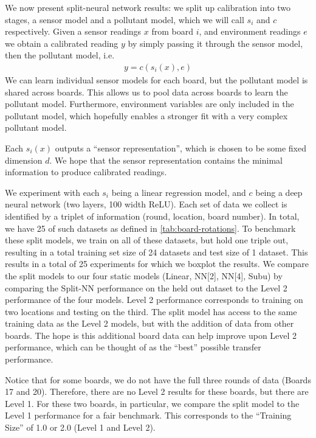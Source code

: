 \documentclass[journal abbreviation, manuscript]{copernicus}
\begin{document}
We now present split-neural network results: we split
up calibration into two stages, a sensor model
and a pollutant model, which we will call $s_i$ and $c$
respectively.
Given a sensor readings $x$ from board $i$,
and environment readings $e$
we obtain a calibrated reading $y$ by simply passing it through
the sensor model, then the pollutant model, i.e.
\begin{align*}
    y = c(s_i(x), e)
\end{align*}
We can learn individual sensor models for each board,
but the pollutant model is shared across boards. This allows
us to pool data across boards to learn the pollutant model.
Furthermore, environment variables are only 
included in the pollutant model, which hopefully enables
a stronger fit with a very complex pollutant model.

Each $s_i(x)$ outputs a ``sensor representation'', which is chosen
to be some fixed dimension $d$. We hope that the sensor representation
contains the minimal information to produce calibrated readings.

We experiment with each $s_i$ being a linear regression model,
and $c$ being a deep neural network (two layers, 100 width ReLU). 
Each set of data we collect
is identified by a triplet of information (round, location, board number). In total, we have 25 of such datasets as defined in \autoref{tab:board-rotations}. To benchmark these split models, we train on all of these datasets, but
hold one triple out, resulting in a
total training set size of 24 datasets and test size of 1 dataset. This results in a total of 25 experiments
for which we boxplot the results.
We compare the split models to our four static models (Linear, NN[2], NN[4], Subu) by comparing the Split-NN performance on the held out dataset to the Level 2 performance of the four models.
Level 2 performance corresponds to training on two locations
and testing on the third. The split model has access to the same training data as the Level 2 models, but with the addition of data from other boards. The hope is this additional board data can help improve upon Level 2 performance, which can be thought of as the ``best'' possible transfer performance.

Notice that for some boards, we do not have the full three rounds of data (Boards 17 and 20). Therefore, there are no Level 2 results for these boards, but there are Level 1. For these two boards, in particular, we compare the split model to the Level 1 performance for a fair benchmark. This corresponds to the ``Training Size'' of 1.0 or 2.0 (Level 1 and Level 2).
\end{document}
